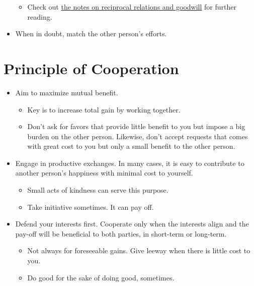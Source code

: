 \documentclass[
]{book}
\providecommand{\tightlist}{%
  \setlength{\itemsep}{0pt}\setlength{\parskip}{0pt}}
\begin{document}
\begin{itemize}
  \begin{itemize}
  \tightlist
  \item
    Check out \protect\hyperlink{reciprocal-relations-and-goodwill}{the notes on reciprocal relations and goodwill} for further reading.
  \end{itemize}
\item
  When in doubt, match the other person's efforts.
\end{itemize}

\hypertarget{principle-of-cooperation}{%
\section{Principle of Cooperation}\label{principle-of-cooperation}}

\begin{itemize}
\tightlist
\item
  Aim to maximize mutual benefit.

  \begin{itemize}
  \tightlist
  \item
    Key is to increase total gain by working together.
  \item
    Don't ask for favors that provide little benefit to you but impose a big burden on the other person. Likewise, don't accept requests that comes with great cost to you but only a small benefit to the other person.
  \end{itemize}
\item
  Engage in productive exchanges. In many cases, it is easy to contribute to another person's happiness with minimal cost to yourself.

  \begin{itemize}
  \tightlist
  \item
    Small acts of kindness can serve this purpose.
  \item
    Take initiative sometimes. It can pay off.
  \end{itemize}
\item
  Defend your interests first. Cooperate only when the interests align and the pay-off will be beneficial to both parties, in short-term or long-term.

  \begin{itemize}
  \tightlist
  \item
    Not always for foreseeable gains. Give leeway when there is little cost to you.
  \item
    Do good for the sake of doing good, sometimes.
  \end{itemize}
\end{itemize}
\end{document}
